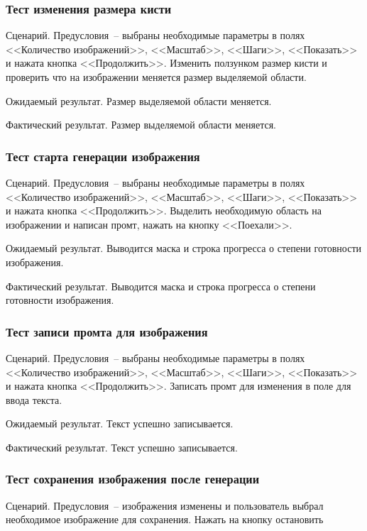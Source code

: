 \subsubsection{Тест изменения размера кисти}

Сценарий. Предусловия~-- выбраны необходимые параметры в полях <<Количество изображений>>, <<Масштаб>>, <<Шаги>>, <<Показать>> и нажата кнопка <<Продолжить>>. Изменить ползунком размер кисти и проверить что на изображении меняется размер выделяемой области.

Ожидаемый результат. Размер выделяемой области меняется.

Фактический результат. Размер выделяемой области меняется.

\subsubsection{Тест старта генерации изображения}

Сценарий. Предусловия~-- выбраны необходимые параметры в полях <<Количество изображений>>, <<Масштаб>>, <<Шаги>>, <<Показать>> и нажата кнопка <<Продолжить>>. Выделить необходимую область на изображении и написан промт, нажать на кнопку <<Поехали>>.

Ожидаемый результат. Выводится маска и строка прогресса о степени готовности изображения.

Фактический результат. Выводится маска и строка прогресса о степени готовности изображения.

\subsubsection{Тест записи промта для изображения}

Сценарий. Предусловия~-- выбраны необходимые параметры в полях <<Количество изображений>>, <<Масштаб>>, <<Шаги>>, <<Показать>> и нажата кнопка <<Продолжить>>. Записать промт для изменения в поле для ввода текста.

Ожидаемый результат. Текст успешно записывается.

Фактический результат. Текст успешно записывается.

\subsubsection{Тест сохранения изображения после генерации}

Сценарий. Предусловия~-- изображения изменены и пользователь выбрал необходимое изображение для сохранения. Нажать на кнопку остановить

